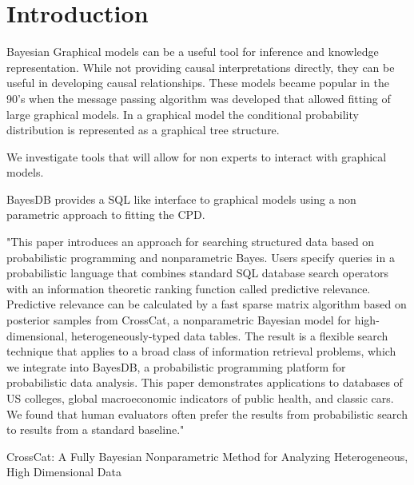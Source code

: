 \section{Introduction}

Bayesian Graphical models can be a useful tool for inference and knowledge representation. While not providing causal interpretations directly, they can be useful in developing causal relationships.  These models became popular in the 90's when the message passing algorithm was developed that allowed fitting of large graphical models. In a graphical model the conditional probability distribution is represented as a graphical tree structure.  

We investigate tools that will allow for non experts to interact with graphical models. 

BayesDB provides a SQL like interface to graphical models using a non parametric approach to fitting the CPD.

"This paper introduces an approach for searching structured data based on probabilistic programming and nonparametric Bayes. Users specify queries in a probabilistic language that combines standard SQL database search operators with an information theoretic ranking function called predictive relevance. Predictive relevance can be calculated by a fast sparse matrix algorithm based on posterior samples from CrossCat, a nonparametric Bayesian model for high-dimensional, heterogeneously-typed data tables. The result is a flexible search technique that applies to a broad class of information retrieval problems, which we integrate into BayesDB, a probabilistic programming platform for probabilistic data analysis. This paper demonstrates applications to databases of US colleges, global macroeconomic indicators of public health, and classic cars. We found that human evaluators often prefer the results from probabilistic search to results from a standard baseline."
\cite{DBLP:journals/corr/SaadCM17}


CrossCat: A Fully Bayesian Nonparametric Method for Analyzing Heterogeneous, High Dimensional Data

